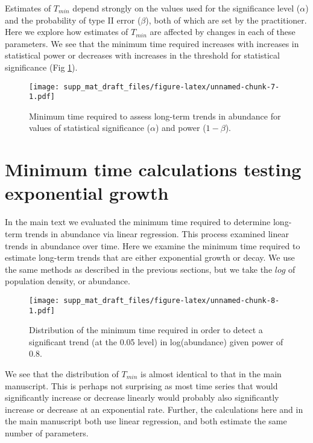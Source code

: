 \documentclass[12pt,]{article}
\begin{document}
Estimates of \(T_{min}\) depend strongly on the values used for the
significance level (\(\alpha\)) and the probability of type II error
(\(\beta\)), both of which are set by the practitioner. Here we explore
how estimates of \(T_{min}\) are affected by changes in each of these
parameters. We see that the minimum time required increases with
increases in statistical power or decreases with increases in the
threshold for statistical significance (Fig
\ref{fig:min_time_vs_alpha_beta}).

\begin{figure}[htbp]
\centering
\texttt{[image: supp\_mat\_draft\_files/figure-latex/unnamed-chunk-7-1.pdf]}
\caption{Minimum time required to assess long-term trends in abundance
for values of statistical significance (\(\alpha\)) and power
(\(1-\beta\)).\label{fig:min_time_vs_alpha_beta}}
\end{figure}

\section{Minimum time calculations testing exponential
growth}\label{minimum-time-calculations-testing-exponential-growth}

In the main text we evaluated the minimum time required to determine
long-term trends in abundance via linear regression. This process
examined linear trends in abundance over time. Here we examine the
minimum time required to estimate long-term trends that are either
exponential growth or decay. We use the same methods as described in the
previous sections, but we take the \(log\) of population density, or
abundance.

\begin{figure}[htbp]
\centering
\texttt{[image: supp\_mat\_draft\_files/figure-latex/unnamed-chunk-8-1.pdf]}
\caption{Distribution of the minimum time required in order to detect a
significant trend (at the 0.05 level) in log(abundance) given power of
0.8.\label{fig:min_time_dist_log_pop}}
\end{figure}

We see that the distribution of \(T_{min}\) is almost identical to that
in the main manuscript. This is perhaps not surprising as most time
series that would significantly increase or decrease linearly would
probably also significantly increase or decrease at an exponential rate.
Further, the calculations here and in the main manuscript both use
linear regression, and both estimate the same number of parameters.
\end{document}
